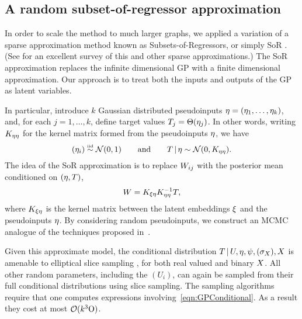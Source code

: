 \subsection{A random subset-of-regressor approximation}

In order to scale the method to much larger graphs, we applied a variation of a sparse approximation method known as Subsets-of-Regressors, or simply SoR \citep{Smola01,Wahba99,Silverman1985}. (See \citep{Quinonero-Candela2005} for an excellent survey of this and other sparse approximations.)  The SoR approximation replaces the infinite dimensional GP with a finite dimensional approximation. Our approach is to treat both the inputs and outputs of the GP as latent variables.

In particular, 
introduce $k$ Gaussian distributed pseudoinputs $\eta=(\eta_1,\dotsc,\eta_k)$, and, for each $j=1,\dotsc,k$, define target values ${T_j = \Theta(\eta_j)}$.  In other words, writing $K_{\eta\eta}$ for the kernel matrix formed from the pseudoinputs $\eta$, we have
\[
(\eta_i) \overset{\mbox{\tiny iid}}{\sim} \mathcal{N}(0,1) \qquad\text{and}\qquad
T \,|\, \eta \sim \mathcal{N}(0,K_{\eta\eta}).
\]
The idea of the SoR approximation is to replace $W_{ij}$ with the posterior mean conditioned on $(\eta,T)$,
\[
W = K_{\xi\eta} K_{\eta\eta}^{-1}T,
\label{eqn:GPConditional}
\]
where $K_{\xi\eta}$ is the kernel matrix between the latent embeddings $\xi$ and the pseudoinputs $\eta$.  By considering random pseudoinputs, we construct an MCMC analogue of the techniques proposed in~\cite{Titsias2008}.

Given this approximate model, the conditional distribution $T \,|\, U, \eta, \psi, (\sigma_X), X$ is amenable to elliptical slice sampling \citep{murray2010}, for both real valued and binary $X$. All other random parameters, including the $(U_i)$, can again be sampled from their full conditional distributions using slice sampling.  The sampling algorithms require that one computes expressions involving~\eqref{eqn:GPConditional}. As a result they cost at most $\mathcal{O}(k^3 \mathrm O)$.

